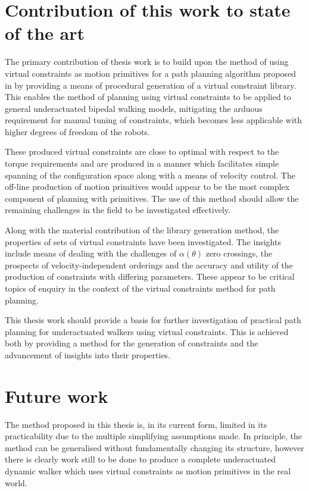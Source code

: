 \section{Contribution of this work to state of the art}
The primary contribution of thesis work is to build upon the method of using virtual constraints as motion primitives for a path planning algorithm proposed in \cite{manchester13planning} by providing a means of procedural generation of a virtual constraint library. This enables the method of planning using virtual constraints to be applied to general underactuated bipedal walking models, mitigating the arduous requirement for manual tuning of constraints, which becomes less applicable with higher degrees of freedom of the robots.

These produced virtual constraints are close to optimal with respect to the torque requirements and are produced in a manner which facilitates simple spanning of the configuration space along with a means of velocity control. The off-line production of motion primitives would appear to be the most complex component of planning with primitives. The use of this method should allow the remaining challenges in the field to be investigated effectively.

Along with the material contribution of the library generation method, the properties of sets of virtual constraints have been investigated. The insights include means of dealing with the challenges of $\alpha(\theta)$ zero crossings, the prospects of velocity-independent orderings and the accuracy and utility of the production of constraints with differing parameters. These appear to be critical topics of enquiry in the context of the virtual constraints method for path planning.

This thesis work should provide a basis for further investigation of practical path planning for underactuated walkers using virtual constraints. This is achieved both by providing a method for the generation of constraints and the advancement of insights into their properties.

\section{Future work}
 The method proposed in this thesis is, in its current form, limited in its practicability due to the multiple simplifying assumptions made. In principle, the method can be generalised without fundamentally changing its structure, however there is clearly work still to be done to produce a complete underactuated dynamic walker which uses virtual constraints as motion primitives in the real world.

